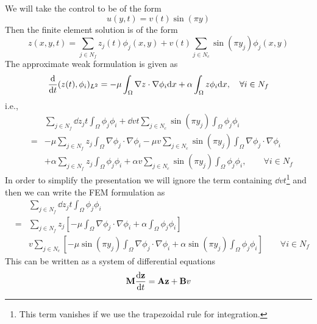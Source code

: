 \documentclass[12pt]{article}
\begin{document}
We will take the control to be of the form
\[
u(y,t) = v(t) \sin(\pi y)
\]
Then the finite element solution is of the form
\[
z(x,y,t) = \sum_{j \in N_f} z_j(t) \phi_j(x,y) + v(t) \sum_{j \in N_c} \sin(\pi y_j) \phi_j(x,y)
\]
The approximate weak formulation is given as
\[
 \frac{\textrm{d} }{\textrm{d} t}(z(t), \phi_i)_{L^2} = - \mu \int_\Omega \nabla z \cdot \nabla \phi_i \textrm{d} x +  \alpha \int_\Omega z \phi_i \textrm{d} x, \quad \forall i \in N_f
\]
i.e.,
\begin{eqnarray*}
&& \sum_{j \in N_f} \dd{z_j}{t} \int_\Omega \phi_j \phi_i + \dd{v}{t} \sum_{j \in N_c} \sin(\pi y_j) \int_\Omega \phi_j \phi_i \\
&=& -\mu \sum_{j \in N_f} z_j \int_\Omega \nabla \phi_j \cdot \nabla \phi_i - \mu v \sum_{j \in N_c} \sin(\pi y_j) \int_\Omega \nabla \phi_j \cdot \nabla \phi_i \\
&& + \alpha \sum_{j \in N_f} z_j \int_\Omega \phi_j \phi_i + \alpha v \sum_{j \in N_c} \sin(\pi y_j) \int_\Omega \phi_j \phi_i, \qquad \forall i \in N_f
\end{eqnarray*}
In order to simplify the presentation we will ignore the term containing $\dd{v}{t}$\footnote{This term vanishes if we use the trapezoidal rule for integration.} and then we can write the FEM formulation as
\begin{eqnarray*}
&& \sum_{j \in N_f} \dd{z_j}{t} \int_\Omega \phi_j \phi_i \\
&=&  \sum_{j \in N_f} z_j \left[ -\mu\int_\Omega \nabla \phi_j \cdot \nabla \phi_i + \alpha \int_\Omega \phi_j \phi_i \right] \\
&& v \sum_{j \in N_c} \left[ - \mu  \sin(\pi y_j) \int_\Omega \nabla \phi_j \cdot \nabla \phi_i + \alpha\sin(\pi y_j) \int_\Omega \phi_j \phi_i \right] \qquad \forall i \in N_f
\end{eqnarray*}
This can be written as a system of differential equations
\[
 {\mathbf M} \frac{\textrm{d} {\mathbf z}}{\textrm{d} t} = {\mathbf A} {\mathbf z} + {\mathbf B} v
\]

\end{document}
